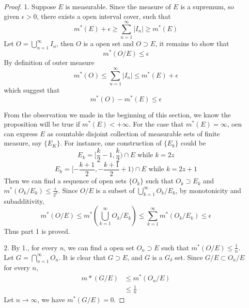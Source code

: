 \documentclass[lang=en, 12pt]{elegantbook}
\begin{document}
            \begin{proof}\par
                1. Suppose $E$ is measurable. Since the measure of $E$ is a supremum, so given $\epsilon > 0$, there exists a open interval 
            cover, such that 
                \begin{equation}
                    m^*(E) + \epsilon \geq \sum_{n=1}^{\infty} |I_n| \geq m^*(E) 
                \end{equation}
                Let $O = \bigcup_{n=1}^{\infty} I_n$, then $O$ is a open set and $O \supset E$, it remains to show that 
                $$m^*(O/E) \leq \epsilon$$
                By definition of outer measure 
                $$m^*(O) \leq \sum_{n=1}^{\infty} |I_n| \leq m^*(E) + \epsilon$$
                which suggest that 
                $$m^*(O)-m^*(E) \leq \epsilon$$\par
                From the observation we made in the beginning of this section, we know the proposition will be true if $m^*(E) < +\infty$.
            For the case that $m^*(E) = \infty$, oen can express $E$ as countable disjoint collection of measurable sets of finite measure, say $\{E_K\}$.
            For instance, one construction of $\{E_k\}$ could be 
            $$E_{k} = [\frac{k}{2}-1, \frac{k}{2}) \cap E \mbox{ while } k=2z $$
            $$E_{k} = [-\frac{k+1}{2}, -\frac{k+1}{2}+1) \cap E \mbox{ while } k=2z+1$$
            Then we can find a sequence of open sets $\{O_k\}$ such that $O_k \supset E_k$ and $m^*(O_k/E_k) \leq \frac{\epsilon}{2^k}$.
            Since $O/E$ is a subset of $\bigcup_{k=1}^{\infty} O_k/E_k$, by monotonicity and subadditivity,
            $$m^*(O/E) \leq m^*(\bigcup_{k=1}^{\infty} O_k/E_k) \leq \sum_{k=1}^{\infty} m^*(O_k/E_k) \leq \epsilon$$
            Thus part 1 is proved.\par
                2. By 1., for every $n$, we can find a open set $O_n \supset E$ such that $m^*(O/E) \leq \frac{1}{n}$. Let 
            $G = \bigcap_{n=1}^{\infty} O_n$. It is clear that $G \supset E$, and $G$ is a $G_{\delta}$ set. Since $G/E \subset O_n/E$
            for every $n$,
            \begin{equation*}
                \begin{aligned}
                    m*(G/E) &\leq m^*(O_n /E)\\
                            &\leq \frac{1}{n}
                \end{aligned}
            \end{equation*}
            Let $n \to \infty$, we have $m^*(G/E) = 0$.\par

\end{proof}
\end{document}
